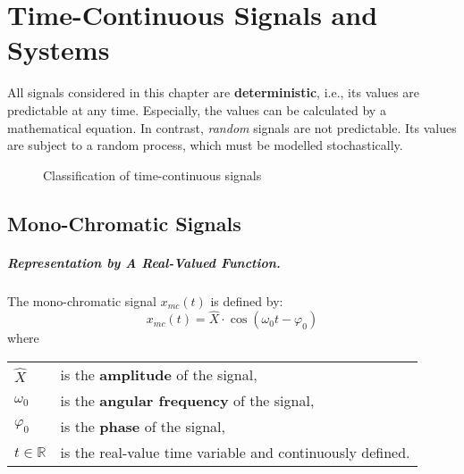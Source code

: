\chapter{Time-Continuous Signals and Systems}

\begin{refsection}

All signals considered in this chapter are  \textbf{deterministic}, i.e., its values are predictable at any time. Especially, the values can be calculated by a mathematical equation. In contrast, \emph{random} signals are not predictable. Its values are subject to a random process, which must be modelled stochastically.

\begin{figure}[H]
	\centering
	\caption{Classification of time-continuous signals}
	\label{fig:ch02:timecont_signals_classif}
\end{figure}

\section{Mono-Chromatic Signals}

\paragraph{Representation by A Real-Valued Function.}

The mono-chromatic signal $x_{mc}(t)$ is defined by:
\begin{equation}
	x_{mc}(t) = \hat{X} \cdot \cos\left(\omega_0 t - \varphi_0\right)
	\label{eq:ch02:mono_chrom_eq}
\end{equation}
where

\begin{tabular}{ll}
	$\hat{X}$ & is the \index{amplitude} \textbf{amplitude} of the signal, \\
	$\omega_0$ & is the \index{angular frequency} \textbf{angular frequency} of the signal, \\
	$\varphi_0$ & is the \index{phase} \textbf{phase} of the signal, \\
	$t \in \mathbb{R}$ & is the real-value time variable and continuously defined.
\end{tabular}


\end{refsection}
